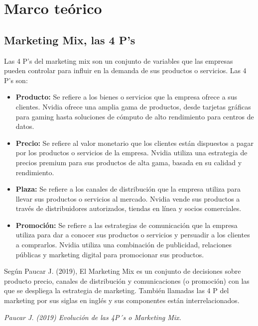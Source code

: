 \documentclass{article}
\newenvironment{marcoTeorico}{}{}
\begin{document}
\begin{marcoTeorico}
  \section{Marco teórico}

  \subsection{Marketing Mix, las 4 P's}

  Las 4 P's del marketing mix son un conjunto de variables que las empresas pueden controlar para influir en la demanda de sus productos o servicios. Las 4 P's son:
  
  \begin{itemize}
    \item \textbf{Producto:} Se refiere a los bienes o servicios que la empresa ofrece a sus clientes. Nvidia ofrece una amplia gama de productos, desde tarjetas gráficas para gaming hasta soluciones de cómputo de alto rendimiento para centros de datos.
    \item \textbf{Precio:} Se refiere al valor monetario que los clientes están dispuestos a pagar por los productos o servicios de la empresa. Nvidia utiliza una estrategia de precios premium para sus productos de alta gama, basada en su calidad y rendimiento.
    \item \textbf{Plaza:} Se refiere a los canales de distribución que la empresa utiliza para llevar sus productos o servicios al mercado. Nvidia vende sus productos a través de distribuidores autorizados, tiendas en línea y socios comerciales.
    \item \textbf{Promoción:} Se refiere a las estrategias de comunicación que la empresa utiliza para dar a conocer sus productos o servicios y persuadir a los clientes a comprarlos. Nvidia utiliza una combinación de publicidad, relaciones públicas y marketing digital para promocionar sus productos.
  \end{itemize}

  Según Paucar J. (2019), El Marketing Mix es un conjunto de decisiones sobre producto precio, canales de distribución y comunicaciones (o promoción) con las que se despliega la estrategia de marketing. También llamadas las 4 P del marketing por sus siglas en inglés y sus componentes están interrelacionados.

  \begin{flushright}
    \textit{Paucar J. (2019) Evolución de las 4P´s o Marketing Mix.}
  \end{flushright}  


\end{marcoTeorico}
\end{document}
